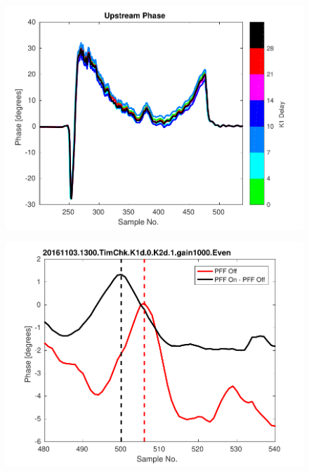 \documentclass[%
 reprint,
 superscriptaddress,
 amsmath,
 amssymb,
 prstab,
]{revtex4-1}
\begin{document}
\begin{figure}
	\includegraphics[width=\columnwidth]{figs/comis/bumpMon2}%
	\caption{\label{f:bumpMon2}
	}
\end{figure}

\begin{figure}
	\includegraphics[width=\columnwidth]{figs/comis/bumpMon3}%
	\caption{\label{f:bumpMon3}
	}
\end{figure}
\end{document}
